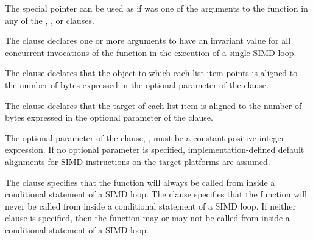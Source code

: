 \cppspecificstart
The special  pointer can be used as if was one of the arguments to the function in any of the , , or  clauses.
\cppspecificend

The  clause declares one or more arguments to have an invariant value for all 
concurrent invocations of the function in the execution of a single SIMD loop.

\begin{samepage}
\ccppspecificstart
The  clause declares that the object to which each list item points is aligned to 
the number of bytes expressed in the optional parameter of the  clause.
\ccppspecificend
\end{samepage}

\begin{samepage}
\fortranspecificstart
The  clause declares that the target of each list item is aligned to the number 
of bytes expressed in the optional parameter of the  clause.
\fortranspecificend
\end{samepage}

The optional parameter of the  clause, , must be a constant positive 
integer expression. If no optional parameter is specified, implementation-defined default 
alignments for SIMD instructions on the target platforms are assumed.

The  clause specifies that the function will always be called from inside a 
conditional statement of a SIMD loop. The  clause specifies that the 
function will never be called from inside a conditional statement of a SIMD loop. If 
neither clause is specified, then the function may or may not be called from inside a 
conditional statement of a SIMD loop.

